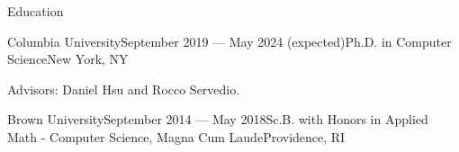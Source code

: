 \documentclass{resume} %
\begin{document}
\begin{rSection}{Education}
\begin{rSubsection}{Columbia University}{September 2019 --- May 2024 (expected)}{Ph.D. in Computer Science}{New York, NY}
\item Advisors: Daniel Hsu and Rocco Servedio.
\end{rSubsection}

\begin{rSubsection}{Brown University}{September 2014 --- May 2018}{Sc.B. with Honors in Applied Math - Computer Science, Magna Cum Laude}{Providence, RI}{}{}
\end{rSubsection}


\end{rSection}




\end{document}
